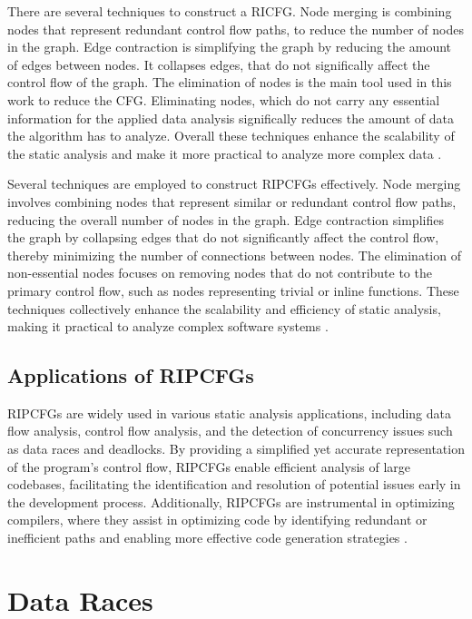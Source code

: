 \documentclass[
fancyheadings, %
%
%
]{stsreprt}
\begin{document}
{		There are several techniques to construct a RICFG. Node merging is combining nodes that represent redundant control flow paths, to reduce the number of nodes in the graph. Edge contraction is simplifying the graph by reducing the amount of edges between nodes. It collapses edges, that do not significally affect the control flow of the graph. The elimination of nodes is the main tool used in this work to reduce the CFG. Eliminating nodes, which do not carry any essential information for the applied data analysis significally reduces the amount of data the algorithm has to analyze. Overall these techniques enhance the scalability of the static analysis and make it more practical to analyze more complex data \cite{muchnick1997}.
		
		Several techniques are employed to construct RIPCFGs effectively. Node merging involves combining nodes that represent similar or redundant control flow paths, reducing the overall number of nodes in the graph. Edge contraction simplifies the graph by collapsing edges that do not significantly affect the control flow, thereby minimizing the number of connections between nodes. The elimination of non-essential nodes focuses on removing nodes that do not contribute to the primary control flow, such as nodes representing trivial or inline functions. These techniques collectively enhance the scalability and efficiency of static analysis, making it practical to analyze complex software systems \cite{muchnick1997}.
		
		\subsection{Applications of RIPCFGs}
		
		RIPCFGs are widely used in various static analysis applications, including data flow analysis, control flow analysis, and the detection of concurrency issues such as data races and deadlocks. By providing a simplified yet accurate representation of the program's control flow, RIPCFGs enable efficient analysis of large codebases, facilitating the identification and resolution of potential issues early in the development process. Additionally, RIPCFGs are instrumental in optimizing compilers, where they assist in optimizing code by identifying redundant or inefficient paths and enabling more effective code generation strategies \cite{muchnick1997}.
		
		\section{Data Races}
		
}
\end{document}
